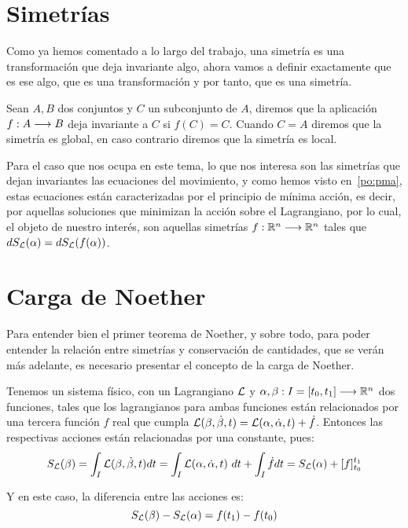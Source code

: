 \section{Simetrías}\label{sec:simetrias}
Como ya hemos comentado a lo largo del trabajo, una simetría es una transformación que deja invariante algo, ahora vamos a definir exactamente que es ese algo, que es una transformación y por tanto, que es una simetría.

Sean $A, B$ dos conjuntos y $C$ un subconjunto de $A$, diremos que la aplicación $f:A\longrightarrow B$ deja invariante a $C$ si $f(C)=C$.
Cuando $C=A$ diremos que la simetría es global, en caso contrario diremos que la simetría es local.

Para el caso que nos ocupa en este tema, lo que nos interesa son las simetrías que dejan invariantes las ecuaciones del movimiento, y como hemos visto en~\eqref{po:pma}, estas ecuaciones están caracterizadas por el principio de mínima acción, es decir, por aquellas soluciones que minimizan la acción sobre el Lagrangiano, por lo cual, el objeto de nuestro interés, son aquellas simetrías $f:\mathbb{R}^n\longrightarrow \mathbb{R}^n$ tales que $dS_{\mathcal{L}}(\alpha)=dS_{\mathcal{L}}(f(\alpha))$.

\section{Carga de Noether}\label{sec:carga-de-noether}
Para entender bien el primer teorema de Noether, y sobre todo, para poder entender la relación entre simetrías y conservación de cantidades, que se verán más adelante, es necesario presentar el concepto de la carga de Noether.

Tenemos un sistema físico, con un Lagrangiano $\mathcal{L}$ y $\alpha,\beta:I=[t_0, t_1]\longrightarrow \mathbb{R}^n$ dos funciones, tales que los lagrangianos para ambas funciones están relacionados por una tercera función $f$ real que cumpla $\mathcal{L}(\beta, \dot{\beta}, t) = \mathcal{L}(\alpha, \dot{\alpha}, t)+\dot{f}$.
Entonces las respectivas acciones están relacionadas por una constante, pues:
\begin{equation}
	\label{eq:variacion-accion}
	S_{\mathcal{L}}(\beta) = \int_I \mathcal{L}(\beta, \dot{\beta}, t) dt = \int_I \mathcal{L}(\alpha, \dot{\alpha}, t)\ dt+\int_I \dot{f}dt=S_{\mathcal{L}}(\alpha) +[f]_{t_0}^{t_1}
\end{equation}

Y en este caso, la diferencia entre las acciones es:
\begin{equation}
	\label{eq:variacion-accion-relacion}
	S_{\mathcal{L}}(\beta) - S_{\mathcal{L}}(\alpha) = f(t_1) - f(t_0)
\end{equation}

